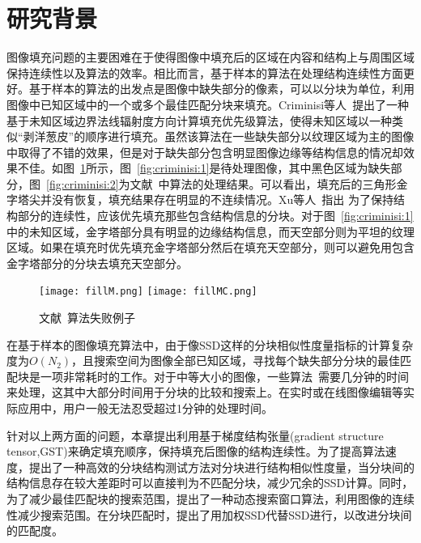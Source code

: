  \section{研究背景}
 \label{background}
 图像填充问题的主要困难在于使得图像中填充后的区域在内容和结构上与周围区域保持连续性以及算法的效率。相比而言，基于样本的算法在处理结构连续性方面更好。基于样本的算法的出发点是图像中缺失部分的像素，可以以分块为单位，利用图像中已知区域中的一个或多个最佳匹配分块来填充。Criminisi等人~\cite{Criminisi04regionfilling}提出了一种基于未知区域边界法线辐射度方向计算填充优先级算法，使得未知区域以一种类似``剥洋葱皮''的顺序进行填充。虽然该算法在一些缺失部分以纹理区域为主的图像中取得了不错的效果，但是对于缺失部分包含明显图像边缘等结构信息的情况却效果不佳。如图~\ref{fig:criminisi}所示，图~\ref{fig:criminisi:1}是待处理图像，其中黑色区域为缺失部分，图~\ref{fig:criminisi:2}为文献~中算法的处理结果。可以看出，填充后的三角形金字塔尖并没有恢复，填充结果存在明显的不连续情况。Xu等人~\cite{Xu:2010}指出 为了保持结构部分的连续性，应该优先填充那些包含结构信息的分块。对于图~\ref{fig:criminisi:1}中的未知区域，金字塔部分具有明显的边缘结构信息，而天空部分则为平坦的纹理区域。如果在填充时优先填充金字塔部分然后在填充天空部分，则可以避免用包含金字塔部分的分块去填充天空部分。\par
 \begin{figure}[htb]
   \centering%
     {\texttt{[image: fillM.png]}}%
  \hspace{1em}%
       {\texttt{[image: fillMC.png]}}
   \caption{文献~算法失败例子}
   \label{fig:criminisi}
 \end{figure}
 在基于样本的图像填充算法中，由于像SSD这样的分块相似性度量指标的计算复杂度为$O(N_2)$，且搜索空间为图像全部已知区域，寻找每个缺失部分分块的最佳匹配块是一项非常耗时的工作。对于中等大小的图像，一些算法~\cite{Xu:2010}需要几分钟的时间来处理，这其中大部分时间用于分块的比较和搜索上。在实时或在线图像编辑等实际应用中，用户一般无法忍受超过1分钟的处理时间。\par
 针对以上两方面的问题，本章提出利用基于梯度结构张量(gradient structure tensor,GST)来确定填充顺序，保持填充后图像的结构连续性。为了提高算法速度，提出了一种高效的分块结构测试方法对分块进行结构相似性度量，当分块间的结构信息存在较大差距时可以直接判为不匹配分块，减少冗余的SSD计算。同时，为了减少最佳匹配块的搜索范围，提出了一种动态搜索窗口算法，利用图像的连续性减少搜索范围。在分块匹配时，提出了用加权SSD代替SSD进行，以改进分块间的匹配度。

